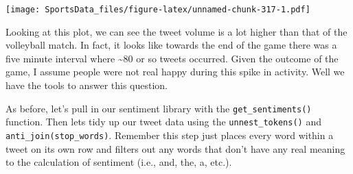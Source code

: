 \documentclass[]{book}
\newenvironment{Shaded}{\begin{snugshade}}{\end{snugshade}}
\newcommand{\DataTypeTok}[1]{\textcolor[rgb]{0.13,0.29,0.53}{#1}}
\newcommand{\KeywordTok}[1]{\textcolor[rgb]{0.13,0.29,0.53}{\textbf{#1}}}
\newcommand{\NormalTok}[1]{#1}
\newcommand{\OperatorTok}[1]{\textcolor[rgb]{0.81,0.36,0.00}{\textbf{#1}}}
\newcommand{\StringTok}[1]{\textcolor[rgb]{0.31,0.60,0.02}{#1}}
\begin{document}
\begin{Shaded}
\end{Shaded}

\texttt{[image: SportsData\_files/figure-latex/unnamed-chunk-317-1.pdf]}

Looking at this plot, we can see the tweet volume is a lot higher than that of the volleyball match. In fact, it looks like towards the end of the game there was a five minute interval where \textasciitilde{}80 or so tweets occurred. Given the outcome of the game, I assume people were not real happy during this spike in activity. Well we have the tools to answer this question.

As before, let's pull in our sentiment library with the \texttt{get\_sentiments()} function. Then lets tidy up our tweet data using the \texttt{unnest\_tokens()} and \texttt{anti\_join(stop\_words)}. Remember this step just places every word within a tweet on its own row and filters out any words that don't have any real meaning to the calculation of sentiment (i.e., and, the, a, etc.).

\begin{Shaded}
\end{Shaded}
\end{document}
